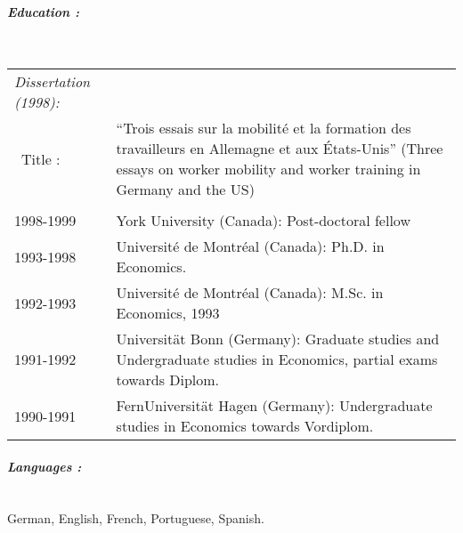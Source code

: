 \documentclass[10pt,letterpaper]{report}
\begin{document}
\paragraph{\it \bf Education :}
\ \\
\begin{tabular}{lp{4in}}
\it Dissertation (1998): \\
\ Title :&``Trois essais sur la mobilit\'e et la formation des travailleurs en Allemagne et aux
\'Etats-Unis'' (Three essays on worker mobility and worker training in
Germany and the US)\\
\\
1998-1999   &    York University (Canada): Post-doctoral fellow \\
1993-1998   &    Universit\'e de Montr\'eal (Canada): Ph.D. in Economics. \\
1992-1993   &    Universit\'e de Montr\'eal (Canada): M.Sc. in Economics, 1993 \\
1991-1992   &    Universit\"at Bonn (Germany): Graduate studies and Undergraduate studies in Economics, partial exams towards Diplom.     \\
1990-1991   &    FernUniversit\"at Hagen (Germany): Undergraduate studies in Economics towards Vordiplom. \\
\end{tabular}

\paragraph{\it \bf Languages :}
\ \\
German, English, French, Portuguese, Spanish. 




 
\end{document}
